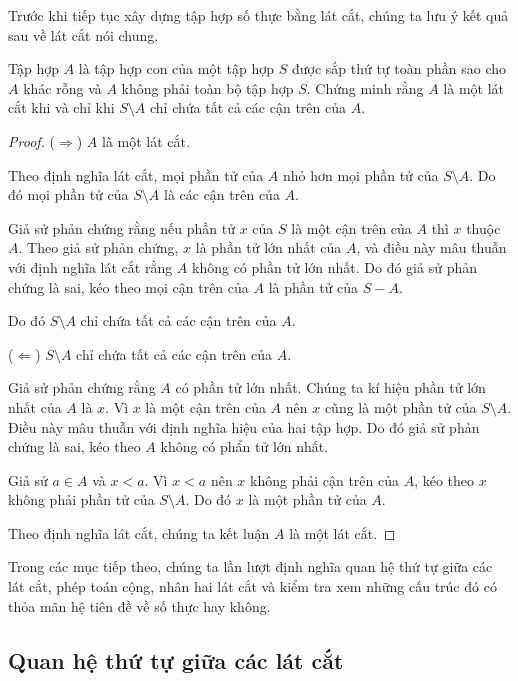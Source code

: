 \noindent Trước khi tiếp tục xây dựng tập hợp số thực bằng lát cắt, chúng ta lưu ý kết quả sau về lát cắt nói chung.
\begin{proposition}\label{proposition:upper-bound-of-dedekind-cut}
    Tập hợp $A$ là tập hợp con của một tập hợp $S$ được sắp thứ tự toàn phần sao cho $A$ khác rỗng và $A$ không phải toàn bộ tập hợp $S$. Chứng minh rằng $A$ là một lát cắt khi và chỉ khi $S\setminus A$ chỉ chứa tất cả các cận trên của $A$.
\end{proposition}

\begin{proof}
    ($\Rightarrow$) $A$ là một lát cắt.

    Theo định nghĩa lát cắt, mọi phần tử của $A$ nhỏ hơn mọi phần tử của $S\setminus A$. Do đó mọi phần tử của $S\setminus A$ là các cận trên của $A$.

    Giả sử phản chứng rằng nếu phần tử $x$ của $S$ là một cận trên của $A$ thì $x$ thuộc $A$. Theo giả sử phản chứng, $x$ là phần tử lớn nhất của $A$, và điều này mâu thuẫn với định nghĩa lát cắt rằng $A$ không có phần tử lớn nhất. Do đó giả sử phản chứng là sai, kéo theo mọi cận trên của $A$ là phần tử của $S - A$.

    Do đó $S\setminus A$ chỉ chứa tất cả các cận trên của $A$.

    \bigskip

    ($\Leftarrow$) $S\setminus A$ chỉ chứa tất cả các cận trên của $A$.

    Giả sử phản chứng rằng $A$ có phần tử lớn nhất. Chúng ta kí hiệu phần tử lớn nhất của $A$ là $x$. Vì $x$ là một cận trên của $A$ nên $x$ cũng là một phần tử của $S\setminus A$. Điều này mâu thuẫn với định nghĩa hiệu của hai tập hợp. Do đó giả sử phản chứng là sai, kéo theo $A$ không có phẩn tử lớn nhất.

    Giả sử $a\in A$ và $x < a$. Vì $x < a$ nên $x$ không phải cận trên của $A$, kéo theo $x$ không phải phần tử của $S\setminus A$. Do đó $x$ là một phần tử của $A$.

    Theo định nghĩa lát cắt, chúng ta kết luận $A$ là một lát cắt.
\end{proof}

Trong các mục tiếp theo, chúng ta lần lượt định nghĩa quan hệ thứ tự giữa các lát cắt, phép toán cộng, nhân hai lát cắt và kiểm tra xem những cấu trúc đó có thỏa mãn hệ tiên đề về số thực hay không.

\subsection{Quan hệ thứ tự giữa các lát cắt}

